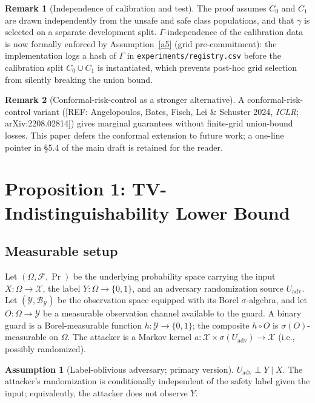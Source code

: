 \documentclass[11pt]{article}
\newcommand{\REF}[1]{{\color{teal}\textsf{[REF: #1]}}}
\theoremstyle{plain}
\theoremstyle{definition}
\newtheorem{assumption}{Assumption}
\newtheorem{remark}{Remark}
\begin{document}
\begin{remark}[Independence of calibration and test]
The proof assumes $C_0$ and $C_1$ are drawn independently from the unsafe and safe class populations,
and that $\gamma$ is selected on a separate development split.
$\Gamma$-independence of the calibration data is now formally enforced by Assumption~\ref{a5} (grid pre-commitment):
the implementation logs a hash of $\Gamma$ in \texttt{experiments/registry.csv} before the calibration split $C_0 \cup C_1$ is instantiated,
which prevents post-hoc grid selection from silently breaking the union bound.
\end{remark}

\begin{remark}[Conformal-risk-control as a stronger alternative]
A conformal-risk-control variant (\REF{Angelopoulos, Bates, Fisch, Lei \& Schuster 2024, \emph{ICLR}; arXiv:2208.02814}) gives marginal guarantees without finite-grid union-bound losses. This paper defers the conformal extension to future work; a one-line pointer in \S 5.4 of the main draft is retained for the reader.
\end{remark}

\section{Proposition 1: TV-Indistinguishability Lower Bound}

\subsection{Measurable setup}\label{sec:prop1-setup}

Let $(\Omega, \mathcal{F}, \Pr)$ be the underlying probability space carrying the input $X: \Omega \to \mathcal{X}$, the label $Y: \Omega \to \{0, 1\}$, and an adversary randomization source $U_{\mathrm{adv}}$.
Let $(\mathcal{Y}, \mathcal{B}_\mathcal{Y})$ be the observation space equipped with its Borel $\sigma$-algebra, and let $O: \Omega \to \mathcal{Y}$ be a measurable observation channel available to the guard.
A binary guard is a Borel-measurable function $h: \mathcal{Y} \to \{0, 1\}$; the composite $h \circ O$ is $\sigma(O)$-measurable on $\Omega$.
The attacker is a Markov kernel $a: \mathcal{X} \times \sigma(U_{\mathrm{adv}}) \to \mathcal{X}$ (i.e., possibly randomized).

\begin{assumption}[Label-oblivious adversary; primary version]\label{a:adv-oblivious}
$U_{\mathrm{adv}} \perp Y \mid X$. The attacker's randomization is conditionally independent of the safety label given the input; equivalently, the attacker does not observe $Y$.
\end{assumption}
\end{document}

